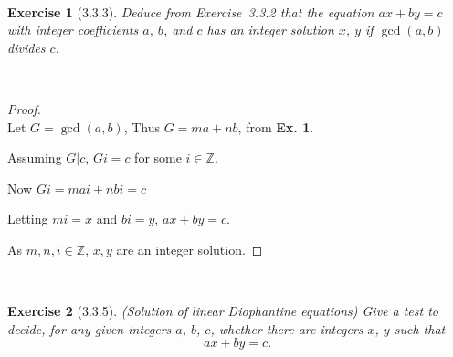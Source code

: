 \documentclass[12pt]{article}
\newcommand{\XB}{\color{black}}
\newcommand{\XBB}{\color{blue}}
\newcommand{\ds}{\displaystyle}
\theoremstyle{plain}
\newtheorem{ex}{Exercise}
\begin{document}
\newpage

\XBB\hrulefill\XB \\
\begin{ex} [3.3.3]
  Deduce from Exercise~3.3.2 that the equation $ax+by=c$ with integer coefficients $a$, $b$, and $c$ has an integer solution $x$, $y$ if $\gcd(a,b)$ divides $c$.
\end{ex}
\XBB\hrulefill\XB \\

\begin{proof}
  \ \\

  Let $ G = \gcd(a, b) $, Thus $ G = ma + nb $, from \textbf{Ex. 1}.

  Assuming $ G|c $, $ Gi = c $ for some $ i \in \mathbb{Z} $.

  Now $ \ds Gi = mai +nbi = c $

  Letting $ mi = x $ and $ bi = y $, $ ax + by = c $.

  As $ m, n, i \in \mathbb{Z} $, $ x, y $ are an integer solution.

\end{proof}

\newpage

\XBB\hrulefill\XB \\
\begin{ex} [3.3.5]
  (Solution of linear Diophantine equations) Give a test to decide, for any given integers $ a $, $ b $, $ c $, whether there are integers $x$, $y$ such that
  \[
    ax + by = c.
  \]
\end{ex}
\XBB\hrulefill\XB \\
\end{document}
